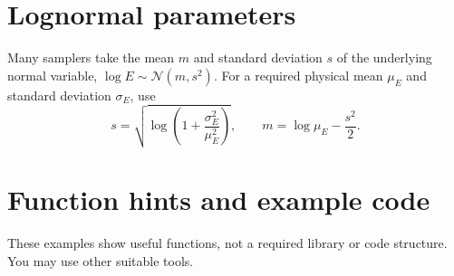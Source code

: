 \documentclass[11pt]{article}
\begin{document}
\vspace{3\baselineskip}
\appendix
\section{Lognormal parameters}\label{sec:lognormal}
Many samplers take the mean $m$ and standard deviation $s$ of the underlying normal variable, $\log E\sim\mathcal N(m,s^2)$. For a required physical mean $\mu_E$ and standard deviation $\sigma_E$, use
\[
s=\sqrt{\log\!\left(1+\frac{\sigma_E^2}{\mu_E^2}\right)},\qquad
m=\log\mu_E-\frac{s^2}{2}.
\]

\section{Function hints and example code}\label{sec:functions}
These examples show useful functions, not a required library or code structure. You may use other suitable tools.
\end{document}
